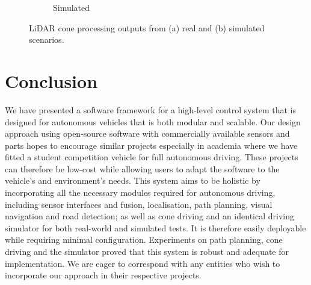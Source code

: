 \begin{figure}[H]
\begin{subfigure}[b]{0.45\textwidth}
		\caption{Simulated}
		\label{fig:7:lidarComparison:2}
	\end{subfigure}             
	\caption[Real and simulated LiDAR output for visual cone processing]{LiDAR cone processing outputs from (a) real and (b) simulated scenarios.}
	\label{fig:7:lidarComparison}
\end{figure}

\section{Conclusion}\label{sec:7:conclusion}
We have presented a software framework for a high-level control system that is designed for autonomous vehicles that is both modular and scalable. Our design approach using open-source software with commercially available sensors and parts hopes to encourage similar projects especially in academia where we have fitted a student competition vehicle for full autonomous driving. These projects can therefore be low-cost while allowing users to adapt the software to the vehicle's and environment's needs. This system aims to be holistic by incorporating all the necessary modules required for autonomous driving, including sensor interfaces and fusion, localisation, path planning, visual navigation and road detection; as well as cone driving and an identical driving simulator for both real-world and simulated tests.  It is therefore easily deployable while requiring minimal configuration. Experiments on path planning, cone driving and the simulator proved that this system is robust and adequate for implementation. We are eager to correspond with any entities who wish to incorporate our approach in their respective projects. 